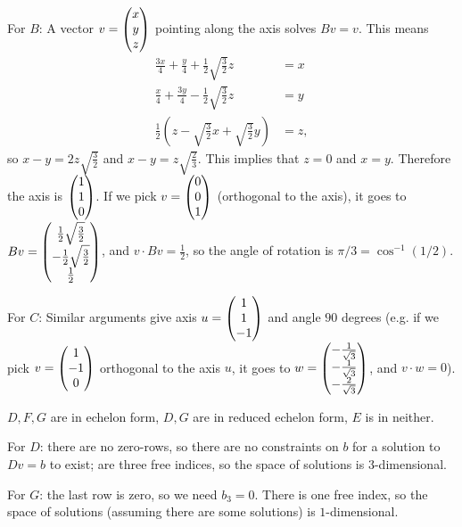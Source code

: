 \documentclass{article}
\begin{document}
\begin{Solution}
For \(B\): A vector \(v=\begin{pmatrix} x \\ y\\ z\end{pmatrix}\) pointing along the axis
solves \(Bv=v\). This means
\begin{align*}
\frac{3x}{4}+\frac{y}{4}+\frac{1}{2}\sqrt{\frac{3}{2}}z&=x\\
\frac{x}{4}+\frac{3y}{4}-\frac{1}{2}\sqrt{\frac{3}{2}}z&=y\\
\frac{1}{2}\left(z-\sqrt{\frac{3}{2}}x+\sqrt{\frac{3}{2}}y\right)&=z,
\end{align*}
so \(x-y=2z\sqrt{\frac{3}{2}}\) and
\(x-y=z\sqrt{\frac{2}{3}}\). This implies that \(z=0\) and
\(x=y\). Therefore the axis is \(\begin{pmatrix} 1 \\ 1 \\ 0\end{pmatrix}\). If we pick
\(v=\begin{pmatrix} 0 \\ 0 \\ 1\end{pmatrix}\) (orthogonal to the axis), it goes to
\(Bv=\begin{pmatrix} \frac{1}{2}\sqrt{\frac{3}{2}}
\\ -\frac{1}{2}\sqrt{\frac{3}{2}} \\ \frac{1}{2}\end{pmatrix}\), and \(v\cdot
Bv=\frac{1}{2}\), so the angle of rotation is
\(\pi/3=\cos^{-1}(1/2)\).


For \(C\): Similar arguments give axis \(u=\begin{pmatrix} 1 \\ 1 \\ -1\end{pmatrix}\) and
angle \(90\) degrees (e.g. if we pick \(v=\begin{pmatrix} 1 \\ -1 \\ 0\end{pmatrix}\)
orthogonal to the axis \(u\), it goes to \(w=\begin{pmatrix} -\frac{1}{\sqrt{3}}
\\ -\frac{1}{\sqrt{3}} \\ -\frac{2}{\sqrt{3}}\end{pmatrix}\), and \(v\cdot
w=0\)). \qedhere


\end{Solution}
\begin{Solution}
\(D,F,G\) are in echelon form, \(D,G\) are in reduced echelon form,
\(E\) is in neither.


\end{Solution}
\begin{Solution}
For \(D\): there are no zero-rows, so there are no constraints on
\(b\) for a solution to \(Dv=b\) to exist; are three free indices,
so the space of solutions is \(3\)-dimensional.


For \(G\): the last row is zero, so we need \(b_3=0\). There is one
free index, so the space of solutions (assuming there are some
solutions) is \(1\)-dimensional.


\end{Solution}
\end{document}
